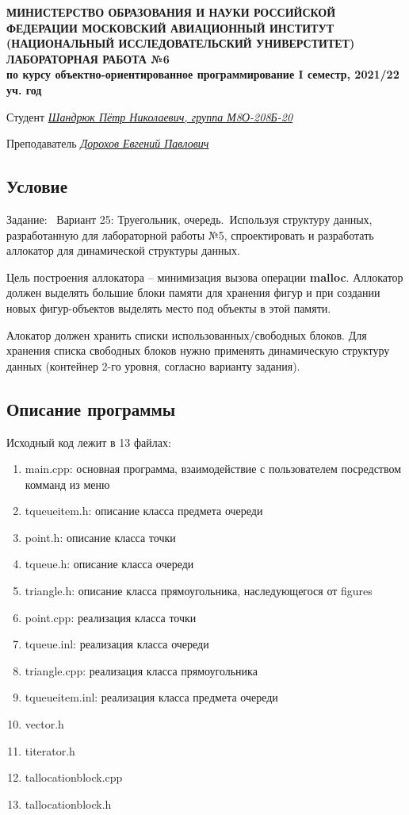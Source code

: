 \documentclass[12pt]{article}
\begin{document}
\begin{titlepage}
\begin{center}
\textbf{МИНИСТЕРСТВО ОБРАЗОВАНИЯ И НАУКИ РОССИЙСКОЙ ФЕДЕРАЦИИ
\medskip
МОСКОВСКИЙ АВИАЦИОННЫЙ ИНСТИТУТ
(НАЦИОНАЛЬНЫЙ ИССЛЕДОВАТЕЛЬСКИЙ УНИВЕРСТИТЕТ)
\vfill\vfill
{\Huge ЛАБОРАТОРНАЯ РАБОТА №6} \\
по курсу объектно-ориентированное программирование
I семестр, 2021/22 уч. год}
\end{center}
\vfill

Студент \uline{\it {Шандрюк Пётр Николаевич, группа М8О-208Б-20}\hfill}

Преподаватель \uline{\it {Дорохов Евгений Павлович}\hfill}

\vfill
\end{titlepage}

\subsection*{Условие}

Задание: \
Вариант 25: Труегольник, очередь.\
Используя структуру данных, разработанную для лабораторной работы №5, спроектировать и
разработать аллокатор для динамической структуры данных.


Цель построения аллокатора – минимизация вызова операции \textbf{malloc}. Аллокатор должен
выделять большие блоки памяти для хранения фигур и при создании новых фигур-объектов
выделять место под объекты в этой памяти.


Алокатор должен хранить списки использованных/свободных блоков. Для хранения списка
свободных блоков нужно применять динамическую структуру данных (контейнер 2-го уровня,
согласно варианту задания).

\subsection*{Описание программы}

Исходный код лежит в 13 файлах:
\begin{enumerate}
\item main.cpp: основная программа, взаимодействие с пользователем посредством комманд из меню
\item tqueueitem.h:    описание класса предмета очереди
\item point.h:     описание класса точки
\item tqueue.h:  описание класса очереди
\item triangle.h: описание класса прямоугольника, наследующегося от figures
\item point.cpp:     реализация класса точки
\item tqueue.inl:  реализация класса очереди
\item triangle.cpp: реализация класса прямоугольника
\item tqueueitem.inl:    реализация класса предмета очереди
\item vector.h
\item titerator.h
\item tallocationblock.cpp
\item tallocationblock.h

\end{enumerate}
\end{document}
